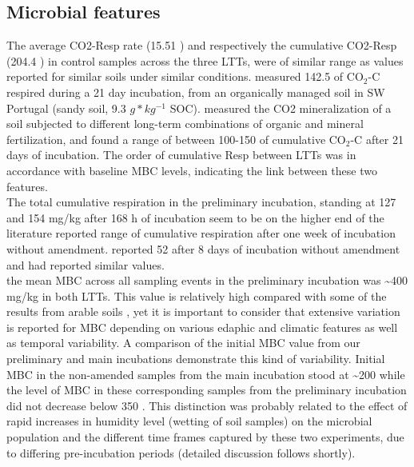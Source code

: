 	\subsection{Microbial features}
	The average CO2-Resp rate (15.51 \respunit) and respectively the cumulative CO2-Resp (204.4 \cumrespunit) in control samples across the three LTTs, were of similar range as values reported for similar soils under similar conditions. \citet{ribeiro2010} measured 142.5 \genericunit of CO$ _2 $-C respired during a 21 day incubation, from an organically managed soil in SW Portugal (sandy soil, 9.3 $ g * kg^{-1} $ SOC). \citet{rudrappa2006} measured the CO2 mineralization of a soil subjected to different long-term combinations of organic and mineral fertilization, and found a range of between 100-150 \genericunit of cumulative CO$ _2 $-C after 21 days of incubation.
	The order of cumulative Resp between LTTs was in accordance with baseline MBC levels, indicating the link between these two features. \\
	The total cumulative respiration in the preliminary incubation, standing at 127 and 154 mg/kg after 168 h of incubation seem to be on the higher end of the literature reported range of cumulative respiration after one week of incubation without amendment. \citet{ribeiro2010} reported 52 \cumrespunit after 8 days of incubation without amendment and \citet{kemmitt2008} had reported similar values. \\
	the mean MBC across all sampling events in the preliminary incubation was \~{}400 mg/kg in both LTTs. This value is relatively high compared with some of the results from arable soils \citep{jat2020, haynes1999,garcia-orenes2010}, yet it is important to consider that extensive variation is reported for MBC depending on various edaphic and climatic features as well as temporal variability\myRed{*}. A comparison of the initial MBC value from our preliminary and main incubations demonstrate this kind of variability. Initial MBC in the non-amended samples from the main incubation stood at \~{}200 \genericunit while the level of MBC in these corresponding samples from the preliminary incubation did not decrease below 350 \genericunit. This distinction was probably related to the effect of rapid increases in humidity level (wetting of soil samples) on the microbial population and the different time frames captured by these two experiments, due to differing pre-incubation periods (detailed discussion follows shortly).\\
